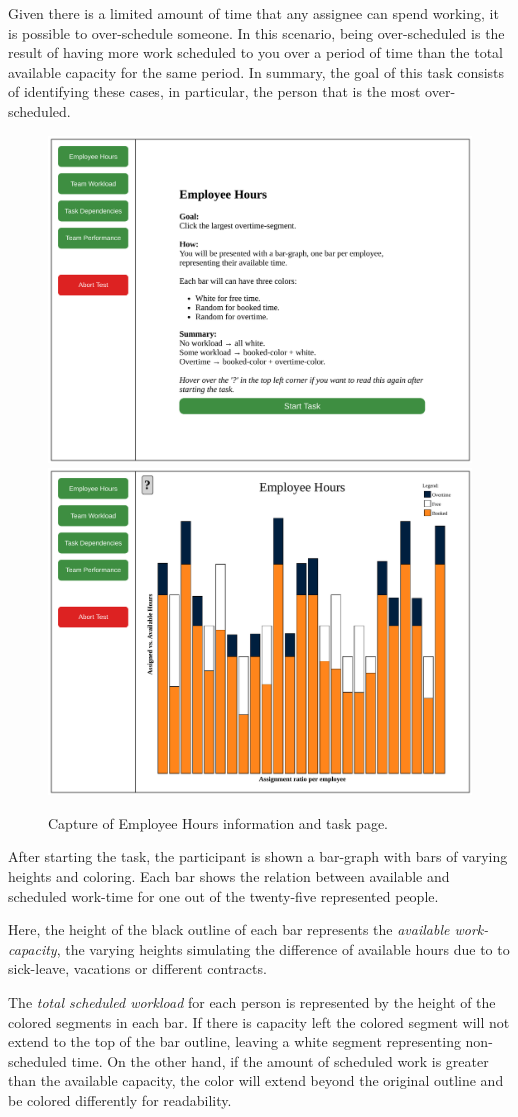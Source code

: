 {    Given there is a limited amount of time that any assignee can spend
    working, it is possible to over-schedule someone. In this scenario,
    being over-scheduled is the result of having more work scheduled to you
    over a period of time than the total available capacity for the same
    period. In summary, the goal of this task consists of identifying these
    cases, in particular, the person that is the most over-scheduled.

    \begin{figure}[h!]
      \centering
      \includegraphics[width=.49\textwidth]{figures/captures/webapp_employee_hours_info.pdf}
      \includegraphics[width=.49\textwidth]{figures/captures/webapp_employee_hours_task.pdf}
      \caption{Capture of Employee Hours information and task page.}
    \end{figure}

    After starting the task, the participant is shown a bar-graph with bars
    of varying heights and coloring. Each bar shows the relation between
    available and scheduled work-time for one out of the twenty-five
    represented people.

    Here, the height of the black outline of each bar represents the
    \textit{available work-capacity}, the varying heights simulating the
    difference of available hours due to to sick-leave, vacations or
    different contracts.

    The \textit{total scheduled workload} for
    each person is represented by the height of the colored segments in
    each bar. If there is capacity left the colored segment will not extend to the
    top of the bar outline, leaving a white segment representing
    non-scheduled time. On the other hand, if the amount of scheduled work
    is greater than the available capacity, the color will extend beyond
    the original outline and be colored differently for readability.

}
